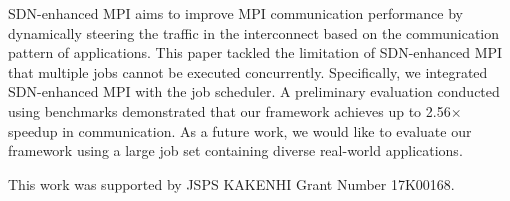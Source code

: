 \documentclass[graybox]{svmult}
\begin{document}
SDN-enhanced MPI aims to improve MPI communication performance by dynamically
steering the traffic in the interconnect based on the communication pattern of
applications. This paper tackled the limitation of SDN-enhanced MPI that
multiple jobs cannot be executed concurrently. Specifically, we integrated
SDN-enhanced MPI with the job scheduler. A preliminary evaluation conducted
using benchmarks demonstrated that our framework achieves up to 2.56$\times$
speedup in communication. As a future work, we would like to evaluate our
framework using a large job set containing diverse real-world applications.

\begin{acknowledgement}
This work was supported by JSPS KAKENHI Grant Number 17K00168.
\end{acknowledgement}



\end{document}
